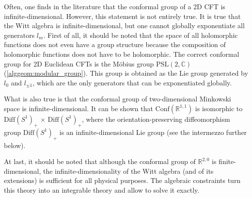 
    \begin{remark}
        Often, one finds in the literature that the conformal group of a 2D CFT is infinite-dimensional. However, this statement is not entirely true. It is true that the Witt algebra is infinite-dimensional, but one cannot globally exponentiate all generators $l_m$. First of all, it should be noted that the space of all holomorphic functions does not even have a group structure because the composition of holomorphic functions does not have to be holomorphic. The correct conformal group for 2D Euclidean CFTs is the M\"obius group $\mathrm{PSL}(2,\mathbb{C})$ (\cref{alggeom:modular_group}). This group is obtained as the Lie group generated by $l_0$ and $l_{\pm1}$, which are the only generators that can be exponentiated globally.

        What is also true is that the conformal group of two-dimensional Minkowski space is infinite-dimensional. It can be shown that $\mathrm{Conf}(\mathbb{R}^{1,1})$ is isomorphic to $\mathrm{Diff}(S^1)_+\,\times\,\mathrm{Diff}(S^1)_+$, where the orientation-preserving diffeomorphism group $\mathrm{Diff}(S^1)_+$ is an infinite-dimensional Lie group (see the intermezzo further below).

        At last, it should be noted that although the conformal group of $\mathbb{R}^{2,0}$ is finite-dimensional, the infinite-dimensionality of the Witt algebra (and of its extensions) is sufficient for all physical purposes. The algebraic constraints turn this theory into an integrable theory and allow to solve it exactly.
    \end{remark}

